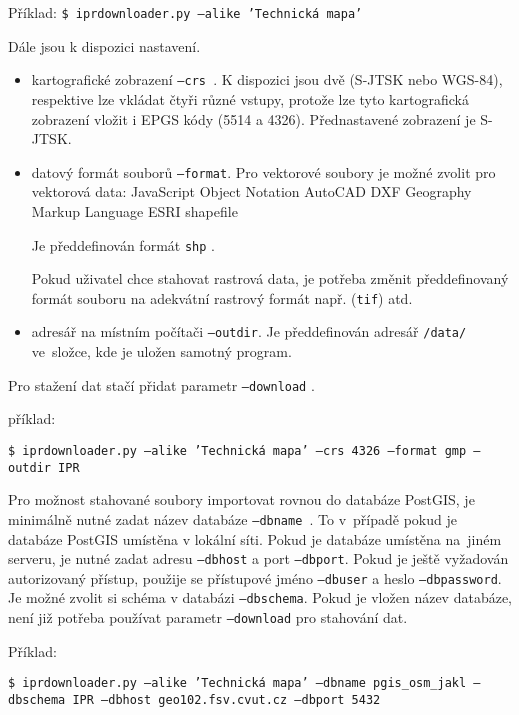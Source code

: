 Příklad:
{\tt \$ iprdownloader.py ---alike 'Technická mapa'}

Dále jsou k dispozici nastavení.
\begin{itemize}
    \item kartografické zobrazení {\tt ---crs }. K dispozici jsou dvě
    (S-JTSK nebo WGS-84), respektive lze vkládat čtyři různé
    vstupy, protože lze tyto kartografická zobrazení vložit i EPGS
    kódy (5514 a 4326). Přednastavené zobrazení je S-JTSK.

    \item datový formát souborů {\tt ---format}.
    Pro vektorové soubory je možné zvolit pro vektorová data:
          JavaScript Object Notation
          AutoCAD DXF
          Geography Markup Language
          ESRI shapefile
        
    Je předdefinován formát {\tt shp} .
         
    Pokud uživatel chce stahovat rastrová data, je potřeba změnit
    předdefinovaný formát souboru na adekvátní rastrový formát např.
    ({\tt tif}) atd.
    
    \item adresář na místním počítači {\tt ---outdir}. Je předdefinován
    adresář {\tt /data/} ve~složce, kde je uložen samotný program.

\end{itemize}

Pro stažení dat stačí přidat parametr {\tt ---download} .

příklad:

{\tt \$ iprdownloader.py ---alike 'Technická mapa' ---crs 4326 ---format gmp ---outdir IPR}

Pro možnost stahované soubory importovat rovnou do databáze
PostGIS, je minimálně nutné zadat název databáze {\tt ---dbname }.
To v~případě pokud je databáze PostGIS umístěna v lokální síti. Pokud
je databáze umístěna na~jiném serveru, je nutné zadat adresu
{\tt ---dbhost} a port {\tt ---dbport}. Pokud je ještě vyžadován
autorizovaný přístup, použije se přístupové jméno {\tt ---dbuser} a
heslo {\tt ---dbpassword}. Je možné zvolit si schéma v databázi
{\tt ---dbschema}. Pokud je vložen název databáze, není již potřeba
používat parametr {\tt ---download} pro stahování dat.

Příklad:

{\tt \$ iprdownloader.py ---alike 'Technická mapa' ---dbname pgis\_osm\_jakl ---dbschema IPR ---dbhost geo102.fsv.cvut.cz  ---dbport 5432 } 
 

